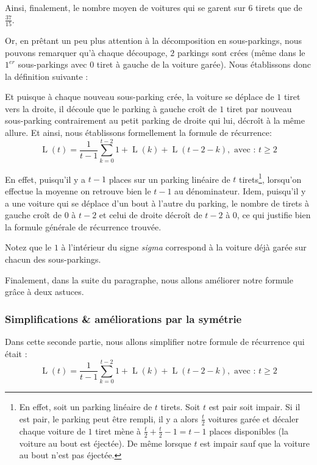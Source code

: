 \documentclass[a4paper,francais,11pt]{article}
\begin{document}
Ainsi, finalement, le nombre moyen de voitures qui se garent sur $6$ tirets que de $\frac{37}{15}$. 

Or, en prêtant un peu plus attention à la décomposition en sous-parkings, nous pouvons remarquer qu'à chaque découpage, $2$ parkings sont crées (même dans le $1^{er}$ sous-parkings avec $0$ tiret à gauche de la voiture garée). Nous établissons donc la définition suivante :


Et puisque à chaque nouveau sous-parking crée, la voiture se déplace de $1$ tiret vers la droite, il découle que le parking à gauche croît de $1$ tiret par nouveau sous-parking contrairement au petit parking de droite qui lui, décroît à la même allure. Et ainsi, nous établissons formellement la formule de récurrence:
\[\operatorname{L}\left(t\right)=\frac{1}{t-1}\sum_{k=0}^{t-2}1+\operatorname{L}\left(k\right) + \operatorname{L}\left(t-2-k\right),\text{ avec : $t\geqslant2$}\]

En effet, puisqu'il y a $t-1$ places sur un parking linéaire de $t$ tirets\footnote{En effet, soit un parking linéaire de $t$ tirets. Soit $t$ est pair soit impair. Si il est pair, le parking peut être rempli, il y a alors $\frac{t}{2}$ voitures garée et décaler chaque voiture de $1$ tiret mène à $\frac{t}{2}+\frac{t}{2}-1=t-1$ places disponibles (la voiture au bout est éjectée). De même lorsque $t$ est impair sauf que la voiture au bout n'est pas éjectée.}, lorsqu'on effectue la moyenne on retrouve bien le $t-1$ au dénominateur. Idem, puisqu'il y a une voiture qui se déplace d'un bout à l'autre du parking, le nombre de tirets à gauche croît de $0$ à $t-2$ et celui de droite décroît de $t-2$ à $0$, ce qui justifie bien la formule générale de récurrence trouvée. 

Notez que le $1$ à l'intérieur du signe \emph{sigma} correspond à la voiture déjà garée sur chacun des sous-parkings.

Finalement, dans la suite du paragraphe, nous allons améliorer notre formule grâce à deux astuces.
\subsubsection{Simplifications \& améliorations par la symétrie}
Dans cette seconde partie, nous allons simplifier notre formule de récurrence qui était :
\[\operatorname{L}\left(t\right)=\frac{1}{t-1}\sum_{k=0}^{t-2}1+\operatorname{L}\left(k\right) + \operatorname{L}\left(t-2-k\right),\text{ avec : $t\geqslant2$}\]
\end{document}
